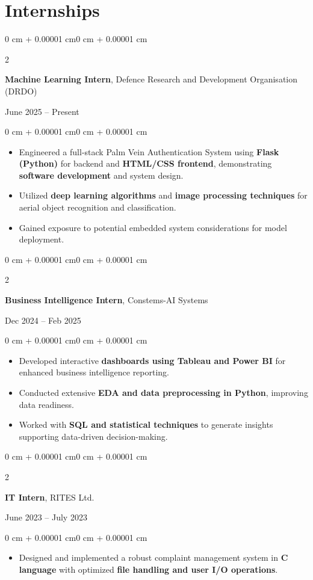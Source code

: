 \documentclass[10pt, letterpaper]{article}
\newenvironment{highlights}{
\begin{itemize}[topsep=0.10 cm,parsep=0.10 cm,partopsep=0pt,itemsep=0pt,leftmargin=0 cm + 10pt]
}{
\end{itemize}
}
\newenvironment{onecolentry}{
\begin{adjustwidth}{0 cm + 0.00001 cm}{0 cm + 0.00001 cm}
}{
\end{adjustwidth}
}
\newenvironment{twocolentry}[2][]{
\onecolentry
\def\secondColumn{#2}
\setcolumnwidth{\fill, 4.5 cm}
\begin{paracol}{2}
}{
\switchcolumn \raggedleft \secondColumn
\end{paracol}
\endonecolentry
}
\begin{document}
\section{Internships}
\begin{twocolentry}{June 2025 – Present}
\textbf{Machine Learning Intern}, Defence Research and Development Organisation (DRDO)
\end{twocolentry}
\begin{onecolentry}
\begin{highlights}
\item Engineered a full-stack Palm Vein Authentication System using \textbf{Flask (Python)} for backend and \textbf{HTML/CSS frontend}, demonstrating \textbf{software development} and system design.
\item Utilized \textbf{deep learning algorithms} and \textbf{image processing techniques} for aerial object recognition and classification.
\item Gained exposure to potential embedded system considerations for model deployment.
\end{highlights}
\end{onecolentry}
\vspace{0.1 cm}
\begin{twocolentry}{Dec 2024 – Feb 2025}
\textbf{Business Intelligence Intern}, Constems-AI Systems
\end{twocolentry}
\begin{onecolentry}
\begin{highlights}
\item Developed interactive \textbf{dashboards using Tableau and Power BI} for enhanced business intelligence reporting.
\item Conducted extensive \textbf{EDA and data preprocessing in Python}, improving data readiness.
\item Worked with \textbf{SQL and statistical techniques} to generate insights supporting data-driven decision-making.
\end{highlights}
\end{onecolentry}
\vspace{0.1 cm}
\begin{twocolentry}{June 2023 – July 2023}
\textbf{IT Intern}, RITES Ltd.
\end{twocolentry}
\begin{onecolentry}
\begin{highlights}
\item Designed and implemented a robust complaint management system in \textbf{C language} with optimized \textbf{file handling and user I/O operations}.
\end{highlights}
\end{onecolentry}
\end{document}
